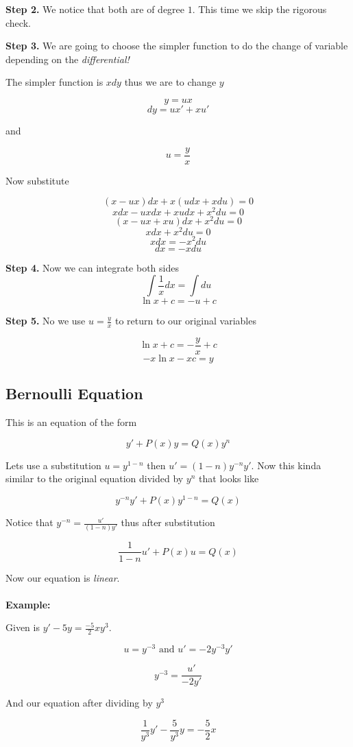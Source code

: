 \textbf{Step 2.} We notice that both are of degree \(1\). This time we skip the rigorous check.

\textbf{Step 3.} We are going to choose the simpler function to do the change of variable 
depending on the \emph{differential!} 

The simpler function is \(xdy\) thus we are to change \(y\)

\[y = ux\]
\[dy = ux' + xu'\]

and 

\[u = \frac{y}{x}\]

Now substitute

\[(x - ux)dx + x(udx + xdu) = 0\]
\[xdx - uxdx + xudx + x^{2}du = 0\]
\[(x - ux + xu)dx + x^{2}du = 0\]
\[xdx + x^{2}du = 0\]
\[xdx = - x^{2}du\]
\[dx = - xdu\]

\textbf{Step 4.} Now we can integrate both sides
\[\int \frac{1}{x}dx = \int du\]
\[\ln x + c = -u + c\]

\textbf{Step 5.} No we use \(u = \frac{y}{x}\) to return to our original variables

\[\ln x + c = -\frac{y}{x} + c\]
\[-x\ln x - xc = y\]

\subsection{Bernoulli Equation}
This is an equation of the form 

\[
y' + P(x)y = Q(x)y^n
\]

Lets use a substitution \(u = y^{1 - n}\) then \(u' = (1 - n)y^{-n} y'\). Now this kinda similar to the original equation
divided by \(y^n\) that looks like

\[
y^{-n}y' + P(x)y^{1 -n} = Q(x)
\]

Notice that \(y^{-n} = \frac{u'}{(1-n)y'}\) thus after substitution

\[
\frac{1}{1 - n}u' + P(x)u = Q(x)
\]

Now our equation is \emph{linear}.
\\\\
\textbf{Example: }

Given is \(y' -5y = \frac{-5}{2}xy^3\).

\[
u = y^{-3}  \text{ and } u' = -2y^{-3}y'
\]

\[
y^{-3} = \frac{u'}{-2y'}
\]

And our equation after dividing by \(y^{3}\)

\[
\frac{1}{y^3}y' - \frac{5}{y^3}y = -\frac{5}{2}x 
\]

